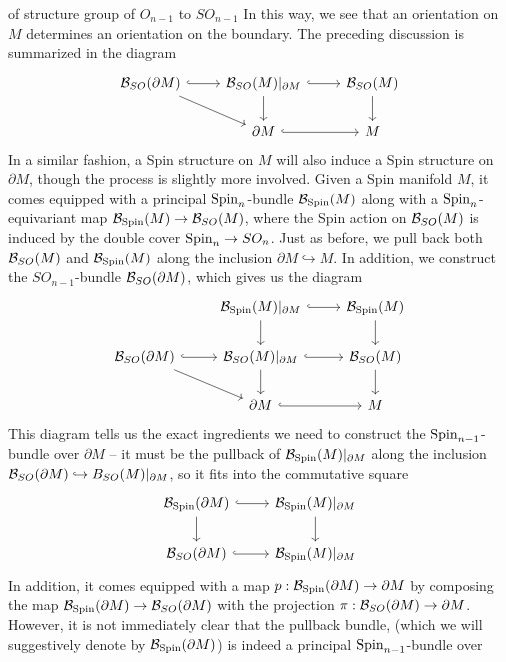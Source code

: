 of structure group of $O_{n-1}$ to $SO_{n-1}$ In this way, we see that an
orientation on $M$ determines an orientation on the boundary. The preceding
discussion is summarized in the diagram
\[\begin{tikzcd}
\B_{SO}(\partial M) \ar[r, hookrightarrow] \ar[dr] &
\B_{SO}(M)\vert_{\partial M} \ar[d] \ar[r, hookrightarrow] & \B_{SO}(M) \ar[d] \\
& \partial M \ar[r, hookrightarrow] & M
\end{tikzcd}\]
In a similar fashion, a Spin structure on $M$ will also induce a Spin structure
on $\partial M$, though the process is slightly more involved. Given a Spin
manifold $M$, it comes equipped with a principal $\mathrm{Spin}_n$-bundle $\mathcal{B}_{\mathrm{Spin}}(M)$
along with a $\mathrm{Spin}_n$-equivariant map $\mathcal{B}_{\mathrm{Spin}}(M) \to \mathcal{B}_{SO}(M)$, where
the Spin action on $\mathcal{B}_{SO}(M)$ is induced by the double cover $\mathrm{Spin}_n \to SO_n$.
Just as before, we pull back both $\mathcal{B}_{SO}(M)$ and $\mathcal{B}_{\mathrm{Spin}}(M)$ along
the inclusion $\partial M \hookrightarrow M$. In addition, we construct the
$SO_{n-1}$-bundle $\mathcal{B}_{SO}(\partial M)$, which gives us the diagram
\[\begin{tikzcd}
&\B_{\Spin}(M)\vert_{\partial M} \ar[r, hookrightarrow]\ar[d] & \B_{\Spin}(M) \ar[d] \\
\B_{SO}(\partial M) \ar[r, hookrightarrow] \ar[dr] &\B_{SO}(M)\vert_{\partial M}
\ar[d] \ar[r, hookrightarrow] & \B_{SO}(M) \ar[d] \\
&\partial M \ar[r, hookrightarrow] & M
\end{tikzcd}\]
This diagram tells us the exact ingredients we need to construct the
$\mathrm{Spin}_{n-1}$-bundle over $\partial M$ -- it must be the pullback of
$\mathcal{B}_{\mathrm{Spin}}(M)\vert_{\partial M}$ along the inclusion
$\mathcal{B}_{SO}(\partial M) \hookrightarrow B_{SO}(M)\vert_{\partial M}$, so it fits
into the commutative square
\[\begin{tikzcd}
\B_{\Spin}(\partial M) \ar[d] \ar[r, hookrightarrow] &
\B_{\Spin}(M)\vert_{\partial M}\ar[d] \\
\B_{SO}(\partial M) \ar[r, hookrightarrow] & \B_{\Spin}(M)\vert_{\partial M}
\end{tikzcd}\]
In addition, it comes equipped with a map $p : \mathcal{B}_{\mathrm{Spin}}(\partial M) \to \partial M$
by composing the map $\mathcal{B}_{\mathrm{Spin}}(\partial M) \to \mathcal{B}_{SO}(\partial M)$ with the projection
$\pi : \mathcal{B}_{SO}(\partial M) \to \partial M$. However, it is not immediately clear
that the pullback bundle, (which we will suggestively denote by
$\mathcal{B}_{\mathrm{Spin}}(\partial M)$) is indeed a principal $\mathrm{Spin}_{n-1}$-bundle over
